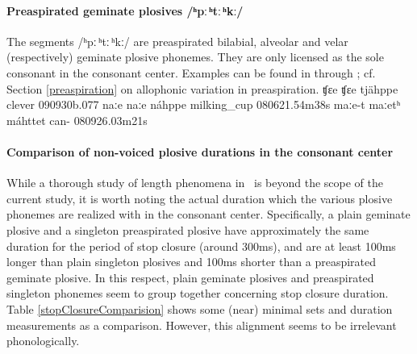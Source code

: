 \paragraph{Preaspirated geminate plosives /ʰpː\,ʰtː\,ʰkː/}
The segments \mbox{/ʰpː\,ʰtː\,ʰkː/} are preaspirated bilabial, alveolar and velar (respectively) geminate plosive phonemes. 
They are only licensed as the sole consonant in the consonant center.  
Examples can be found in  through ; cf. Section \ref{preaspiration} on allophonic variation in preaspiration. 
		{ʧɛe}		{ʧɛe}		{tjähppe}	{clever\BS{}}		{090930b}{.077}
	{naːe}	{naːe}	{náhppe}	{milking\_cup\BS{}}	{080621}{.54m38s}
			{maːe-t}	{maːetʰ}	{máhttet}	{can-}			{080926}{.03m21s}


\paragraph[Non-voiced plosive durations in the consonant center]{Comparison of non-voiced plosive durations in the consonant center}\label{plosiveDurationComparison}
While a thorough study of length phenomena in \PS\ is beyond the scope of the current study, it is worth noting the actual duration which the various plosive phonemes are realized with in the consonant center. %
Specifically, %
a plain geminate plosive and a singleton preaspirated plosive have approximately the same duration for the period of stop closure (around 300ms), and are at least 100ms longer than plain singleton plosives and 100ms shorter than a preaspirated geminate plosive. In this respect, plain geminate plosives and preaspirated singleton phonemes seem to group together concerning stop closure duration. 
Table \vref{stopClosureComparision} %
shows some (near) minimal sets and duration measurements as a comparison. However, this alignment seems to be irrelevant phonologically. 

